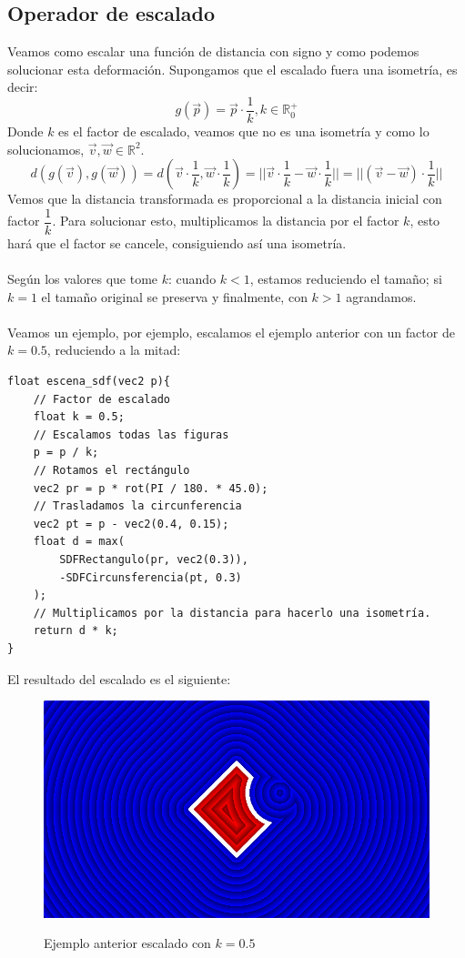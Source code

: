 \subsection{Operador de escalado}
Veamos como escalar una función de distancia con signo y como podemos solucionar esta deformación. Supongamos que el escalado fuera una isometría, es decir:
\[g(\Vec{p})=\Vec{p}\cdot \dfrac{1}{k}, k \in \mathbb{R}^{+}_{0}\]
Donde \(k\) es el factor de escalado, veamos que no es una isometría y como lo solucionamos, \(\Vec{v},\Vec{w}\in \mathbb{R}^2\).
\[d(g(\Vec{v}),g(\Vec{w}))=d\left(\Vec{v}\cdot \dfrac{1}{k}, \Vec{w}\cdot \dfrac{1}{k}\right) = \vert\vert \Vec{v}\cdot \dfrac{1}{k} - \Vec{w}\cdot \dfrac{1}{k}\vert\vert=\vert\vert (\Vec{v} - \Vec{w})\cdot \dfrac{1}{k}\vert\vert\]
Vemos que la distancia transformada es proporcional a la distancia inicial con factor \(\dfrac{1}{k}\). Para solucionar esto, multiplicamos la distancia por el factor \(k\), esto hará que el factor se cancele, consiguiendo así una isometría.\\\\
Según los valores que tome \(k\): cuando \(k<1\), estamos reduciendo el tamaño; si \(k=1\) el tamaño original se preserva y finalmente, con \(k>1\) agrandamos.\\\\
Veamos un ejemplo, por ejemplo, escalamos el ejemplo anterior con un factor de \(k=0.5\), reduciendo a la mitad:
\begin{lstlisting}
float escena_sdf(vec2 p){
    // Factor de escalado
    float k = 0.5;
    // Escalamos todas las figuras
    p = p / k;
    // Rotamos el rectángulo
    vec2 pr = p * rot(PI / 180. * 45.0);
    // Trasladamos la circunferencia
    vec2 pt = p - vec2(0.4, 0.15);
    float d = max(
        SDFRectangulo(pr, vec2(0.3)),
        -SDFCircunsferencia(pt, 0.3)
    );
    // Multiplicamos por la distancia para hacerlo una isometría.
    return d * k;
}
\end{lstlisting}

El resultado del escalado es el siguiente:

\begin{figure}[H]
  \centering
  \captionsetup{justification=centering}%
  \includegraphics[width=1.0\textwidth]{secciones/imagenes/sdf/2d/sdf_subtracted_scale.png}\label{fig:substraction}
  \caption{Ejemplo anterior escalado con \(k=0.5\)}
\end{figure}



